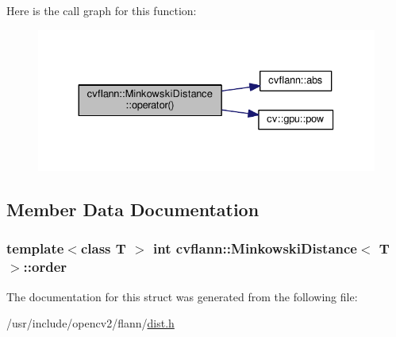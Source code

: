 Here is the call graph for this function\-:\nopagebreak
\begin{figure}[H]
\begin{center}
\leavevmode
\includegraphics[width=330pt]{structcvflann_1_1MinkowskiDistance_ac9ebfdd3f6bbf978ef88d68510828b75_cgraph}
\end{center}
\end{figure}




\subsection{Member Data Documentation}
\hypertarget{structcvflann_1_1MinkowskiDistance_a2703b6de832914cac0163cab19803759}{
\subsubsection[{order}]{\setlength{\rightskip}{0pt plus 5cm}template$<$class T $>$ int {\bf cvflann\-::\-Minkowski\-Distance}$<$ {\bf T} $>$\-::order}}\label{structcvflann_1_1MinkowskiDistance_a2703b6de832914cac0163cab19803759}


The documentation for this struct was generated from the following file\-:\begin{DoxyCompactItemize}
\item 
/usr/include/opencv2/flann/\hyperlink{dist_8h}{dist.\-h}\end{DoxyCompactItemize}
